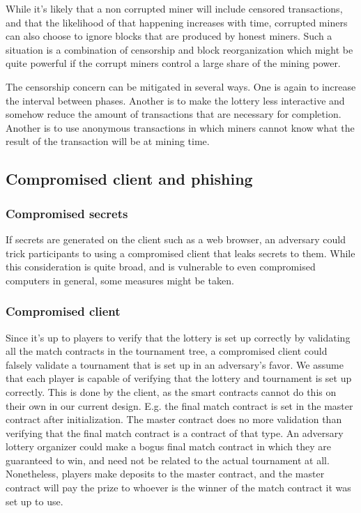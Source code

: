 While it's likely that a non corrupted miner will include censored transactions, and that the likelihood of that happening increases with time, corrupted miners can also choose to ignore blocks that are produced by honest miners. Such a situation is a combination of censorship and block reorganization which might be quite powerful if the corrupt miners control a large share of the mining power.

The censorship concern can be mitigated in several ways. One is again to increase the interval between phases. Another is to make the lottery less interactive and somehow reduce the amount of transactions that are necessary for completion. Another is to use anonymous transactions in which miners cannot know what the result of the transaction will be at mining time.

\subsection{Compromised client and phishing}
\subsubsection{Compromised secrets}
If secrets are generated on the client such as a web browser, an adversary could trick participants to using a compromised client that leaks secrets to them. While this consideration is quite broad, and is vulnerable to even compromised computers in general, some measures might be taken.

\subsubsection{Compromised client}
Since it's up to players to verify that the lottery is set up correctly by validating all the match contracts in the tournament tree, a compromised client could falsely validate a tournament that is set up in an adversary's favor. We assume that each player is capable of verifying that the lottery and tournament is set up correctly. This is done by the client, as the smart contracts cannot do this on their own in our current design. E.g. the final match contract is set in the master contract after initialization. The master contract does no more validation than verifying that the final match contract is a contract of that type. An adversary lottery organizer could make a bogus final match contract in which they are guaranteed to win, and need not be related to the actual tournament at all. Nonetheless, players make deposits to the master contract, and the master contract will pay the prize to whoever is the winner of the match contract it was set up to use.

